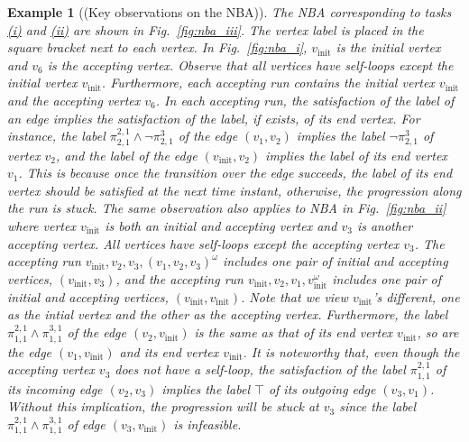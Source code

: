 \documentclass[Afour,sageh,times]{sagej}
\newtheorem{exmp}{Example}
\newcommand{\vertex}[1]{v_{\text{#1}}}
\renewcommand{\ap}[3]{\mathcal{\pi}_{{#1},{#2}}^{#3}}
\newenvironment{cexmp}
{\addtocounter{exmp}{-1}\begin{exmp}}
  {\end{exmp}}
\begin{document}
 \begin{cexmp}[(Key observations on the NBA)]
   The NBA corresponding to tasks \hyperref[task:i]{\it (i)} and \hyperref[task:i]{\it (ii)} are shown in Fig.~\ref{fig:nba_iii}. The vertex label is placed in the square bracket next to each vertex. In Fig.~\ref{fig:nba_i}, $\vertex{init}$ is the initial vertex and $v_6$ is the accepting vertex. Observe that all vertices have self-loops except the initial vertex $\vertex{init}$. Furthermore, each accepting run contains the initial vertex $\vertex{init}$ and the accepting vertex $v_6$. In each accepting run, the satisfaction of the label of an edge implies the satisfaction of the label, if exists, of its end vertex. For instance, the label $\ap{2}{1}{2,1} \wedge \neg\ap{2}{1}{3}$ of the edge $(v_1, v_2)$ implies the label $\neg\ap{2}{1}{3}$ of vertex $v_2$, and  the label of the edge  $(\vertex{init}, v_2)$ implies the label of  its end vertex $v_1$. This is because once the transition over the edge succeeds, the label of its end vertex should be satisfied at the next time instant, otherwise, the progression along the run is stuck.
   The same observation also applies to NBA in Fig.~\ref{fig:nba_ii} where vertex $\vertex{init}$ is both an initial and accepting vertex and $v_3$ is another accepting vertex. All vertices have self-loops except the accepting vertex $v_3$. The accepting run $\vertex{init}, v_2, v_3, (v_1, v_2, v_3)^\omega$ includes one pair of initial and accepting vertices, $(\vertex{init}, v_3)$, and the accepting run $\vertex{init}, v_2, v_1, \vertex{init}^\omega$ includes one pair of initial and accepting vertices, $(\vertex{init}, \vertex{init})$. Note that we view $\vertex{init}$'s different, one as the intial vertex and the other as the accepting vertex. Furthermore, the label $\ap{1}{1}{2,1}\wedge \ap{1}{1}{3,1}$ of the edge $(v_2, \vertex{init})$ is the same as that of its end vertex $\vertex{init}$, so are the edge $(v_1, \vertex{init})$ and its end vertex $\vertex{init}$. It is noteworthy that, even though the accepting vertex $v_3$ does not have a self-loop, the satisfaction of the label $\ap{1}{1}{2,1}$ of its incoming edge $(v_2, v_3)$ implies the label $\top$ of its outgoing edge $(v_3, v_1)$. Without this implication, the progression will be stuck at $v_3$ since the label $\ap{1}{1}{2,1} \wedge \ap{1}{1}{3,1}$ of edge $(v_3, \vertex{init})$ is infeasible.
 \end{cexmp}
\end{document}
